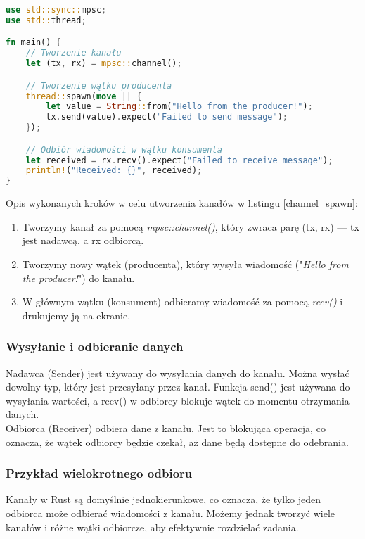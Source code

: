 \begin{lstlisting}[language=Rust, caption=Przykład tworzenia kanału, label=channel_spawn]
use std::sync::mpsc;
use std::thread;

fn main() {
    // Tworzenie kanału
    let (tx, rx) = mpsc::channel();

    // Tworzenie wątku producenta
    thread::spawn(move || {
        let value = String::from("Hello from the producer!");
        tx.send(value).expect("Failed to send message");
    });

    // Odbiór wiadomości w wątku konsumenta
    let received = rx.recv().expect("Failed to receive message");
    println!("Received: {}", received);
}
\end{lstlisting}
Opis wykonanych kroków w celu utworzenia kanałów w listingu \ref{channel_spawn}:
\begin{enumerate}
    \item Tworzymy kanał za pomocą \textit{mpsc::channel()}, który zwraca parę (tx, rx) — tx jest nadawcą, a rx odbiorcą.
    \item Tworzymy nowy wątek (producenta), który wysyła wiadomość ("\textit{Hello from the producer!}") do kanału.
    \item W głównym wątku (konsument) odbieramy wiadomość za pomocą \textit{recv()} i drukujemy ją na ekranie.
\end{enumerate}

\subsubsection{Wysyłanie i odbieranie danych}
Nadawca (Sender) jest używany do wysyłania danych do kanału. Można wysłać dowolny typ, który jest przesyłany przez kanał. Funkcja send() jest używana do wysyłania wartości, a recv() w odbiorcy blokuje wątek do momentu otrzymania danych.\\
Odbiorca (Receiver) odbiera dane z kanału. Jest to blokująca operacja, co oznacza, że wątek odbiorcy będzie czekał, aż dane będą dostępne do odebrania.

\subsubsection{Przykład wielokrotnego odbioru}
Kanały w Rust są domyślnie jednokierunkowe, co oznacza, że tylko jeden odbiorca może odbierać wiadomości z kanału. Możemy jednak tworzyć wiele kanałów i różne wątki odbiorcze, aby efektywnie rozdzielać zadania.

